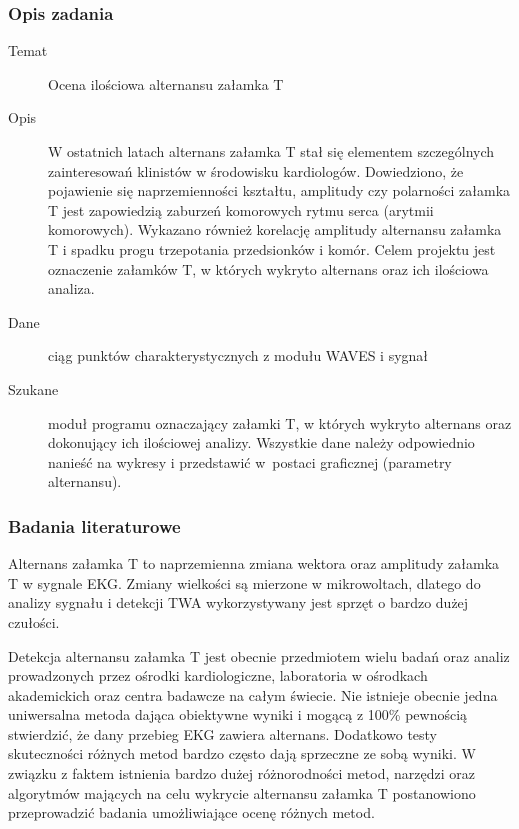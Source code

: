 \documentclass[a4paper, 11pt]{article}
\begin{document}
\subsubsection{Opis zadania}
\label{sec::t_wave_alt:desc}

\begin{description}
\item[Temat] Ocena ilościowa alternansu załamka T
\item[Opis] W ostatnich latach alternans załamka T stał się
 elementem szczególnych zainteresowań klinistów w środowisku kardiologów.
 Dowiedziono, że pojawienie się naprzemienności kształtu, amplitudy czy
 polarności załamka T jest zapowiedzią zaburzeń komorowych rytmu serca 
(arytmii komorowych). Wykazano również korelację amplitudy alternansu 
załamka T i spadku progu trzepotania przedsionków i komór. Celem projektu
 jest oznaczenie załamków T, w których wykryto alternans oraz ich ilościowa analiza.
\item[Dane] ciąg punktów charakterystycznych z modułu WAVES i sygnał 
\item[Szukane] moduł programu oznaczający załamki T, w których wykryto alternans
 oraz dokonujący ich ilościowej analizy. Wszystkie dane należy odpowiednio nanieść
 na wykresy i przedstawić w~postaci graficznej (parametry alternansu).
\end{description}

\subsubsection{Badania literaturowe}
\label{sec::t_wave_alt:papers}
Alternans załamka T to naprzemienna zmiana wektora oraz amplitudy załamka T w sygnale EKG. Zmiany wielkości są mierzone w mikrowoltach, dlatego do analizy sygnału i detekcji TWA wykorzystywany jest sprzęt o bardzo dużej czułości. 

Detekcja alternansu załamka T jest obecnie przedmiotem wielu badań oraz analiz prowadzonych przez ośrodki kardiologiczne, laboratoria w ośrodkach akademickich oraz centra badawcze na całym świecie. Nie istnieje obecnie jedna uniwersalna metoda dająca obiektywne wyniki i mogącą z 100\% pewnością stwierdzić, że dany przebieg EKG zawiera alternans. Dodatkowo testy skuteczności różnych metod bardzo często dają sprzeczne ze sobą wyniki. W związku z faktem istnienia bardzo dużej różnorodności metod, narzędzi oraz algorytmów mających na celu wykrycie alternansu załamka T postanowiono przeprowadzić badania umożliwiające ocenę różnych metod.
\end{document}
